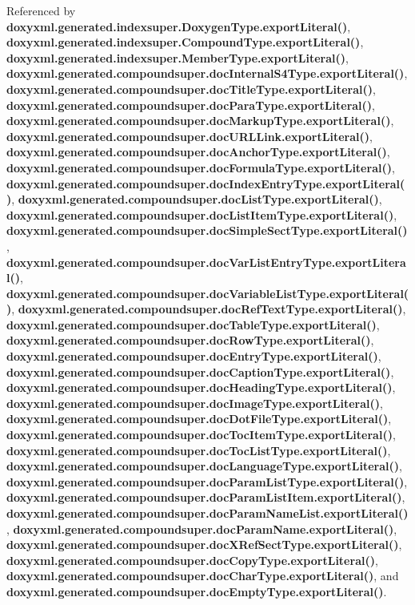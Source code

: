 Referenced by {\bf doxyxml.\+generated.\+indexsuper.\+Doxygen\+Type.\+export\+Literal()}, {\bf doxyxml.\+generated.\+indexsuper.\+Compound\+Type.\+export\+Literal()}, {\bf doxyxml.\+generated.\+indexsuper.\+Member\+Type.\+export\+Literal()}, {\bf doxyxml.\+generated.\+compoundsuper.\+doc\+Internal\+S4\+Type.\+export\+Literal()}, {\bf doxyxml.\+generated.\+compoundsuper.\+doc\+Title\+Type.\+export\+Literal()}, {\bf doxyxml.\+generated.\+compoundsuper.\+doc\+Para\+Type.\+export\+Literal()}, {\bf doxyxml.\+generated.\+compoundsuper.\+doc\+Markup\+Type.\+export\+Literal()}, {\bf doxyxml.\+generated.\+compoundsuper.\+doc\+U\+R\+L\+Link.\+export\+Literal()}, {\bf doxyxml.\+generated.\+compoundsuper.\+doc\+Anchor\+Type.\+export\+Literal()}, {\bf doxyxml.\+generated.\+compoundsuper.\+doc\+Formula\+Type.\+export\+Literal()}, {\bf doxyxml.\+generated.\+compoundsuper.\+doc\+Index\+Entry\+Type.\+export\+Literal()}, {\bf doxyxml.\+generated.\+compoundsuper.\+doc\+List\+Type.\+export\+Literal()}, {\bf doxyxml.\+generated.\+compoundsuper.\+doc\+List\+Item\+Type.\+export\+Literal()}, {\bf doxyxml.\+generated.\+compoundsuper.\+doc\+Simple\+Sect\+Type.\+export\+Literal()}, {\bf doxyxml.\+generated.\+compoundsuper.\+doc\+Var\+List\+Entry\+Type.\+export\+Literal()}, {\bf doxyxml.\+generated.\+compoundsuper.\+doc\+Variable\+List\+Type.\+export\+Literal()}, {\bf doxyxml.\+generated.\+compoundsuper.\+doc\+Ref\+Text\+Type.\+export\+Literal()}, {\bf doxyxml.\+generated.\+compoundsuper.\+doc\+Table\+Type.\+export\+Literal()}, {\bf doxyxml.\+generated.\+compoundsuper.\+doc\+Row\+Type.\+export\+Literal()}, {\bf doxyxml.\+generated.\+compoundsuper.\+doc\+Entry\+Type.\+export\+Literal()}, {\bf doxyxml.\+generated.\+compoundsuper.\+doc\+Caption\+Type.\+export\+Literal()}, {\bf doxyxml.\+generated.\+compoundsuper.\+doc\+Heading\+Type.\+export\+Literal()}, {\bf doxyxml.\+generated.\+compoundsuper.\+doc\+Image\+Type.\+export\+Literal()}, {\bf doxyxml.\+generated.\+compoundsuper.\+doc\+Dot\+File\+Type.\+export\+Literal()}, {\bf doxyxml.\+generated.\+compoundsuper.\+doc\+Toc\+Item\+Type.\+export\+Literal()}, {\bf doxyxml.\+generated.\+compoundsuper.\+doc\+Toc\+List\+Type.\+export\+Literal()}, {\bf doxyxml.\+generated.\+compoundsuper.\+doc\+Language\+Type.\+export\+Literal()}, {\bf doxyxml.\+generated.\+compoundsuper.\+doc\+Param\+List\+Type.\+export\+Literal()}, {\bf doxyxml.\+generated.\+compoundsuper.\+doc\+Param\+List\+Item.\+export\+Literal()}, {\bf doxyxml.\+generated.\+compoundsuper.\+doc\+Param\+Name\+List.\+export\+Literal()}, {\bf doxyxml.\+generated.\+compoundsuper.\+doc\+Param\+Name.\+export\+Literal()}, {\bf doxyxml.\+generated.\+compoundsuper.\+doc\+X\+Ref\+Sect\+Type.\+export\+Literal()}, {\bf doxyxml.\+generated.\+compoundsuper.\+doc\+Copy\+Type.\+export\+Literal()}, {\bf doxyxml.\+generated.\+compoundsuper.\+doc\+Char\+Type.\+export\+Literal()}, and {\bf doxyxml.\+generated.\+compoundsuper.\+doc\+Empty\+Type.\+export\+Literal()}.




